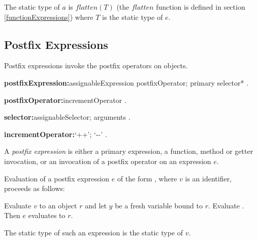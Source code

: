 \documentclass{article}
\begin{document}



\LMHash{}
The static type of $a$ is $flatten(T)$ (the $flatten$ function is defined in section \ref{functionExpressions}) where $T$ is the static type of $e$.


\subsection{Postfix Expressions}

\LMHash{}
Postfix expressions invoke the postfix operators on objects.

\begin{grammar}
{\bf postfixExpression:}assignableExpression postfixOperator;
  primary selector*
  .

{\bf postfixOperator:}incrementOperator
  .

{\bf selector:}assignableSelector;
  arguments
  .

{\bf incrementOperator:}`++';
  `-{}-'
  .
\end{grammar}

\LMHash{}
 A {\em postfix expression} is either a primary expression, a function, method or getter invocation, or an invocation of a postfix operator on an expression $e$.

\LMHash{}
Evaluation of a postfix expression $e$ of the form , where $v$ is an identifier, proceeds as follows:

\LMHash{}
Evaluate $v$ to an object $r$ and let $y$ be a fresh variable bound to $r$.
Evaluate .
Then $e$ evaluates to $r$.

\LMHash{}
The static type of such an expression is the static type of $v$.

\end{document}
